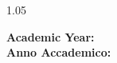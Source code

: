 \begin{titlepage}
\begin{spacing}{1.05}
    \vspace{14mm}

    \begin{center}
        \large{
            {\bf Academic Year: \\ }
            {\bf Anno Accademico: \\ }
            \accademicyear
        }
    \end{center}
    \end{spacing}
\end{titlepage}
